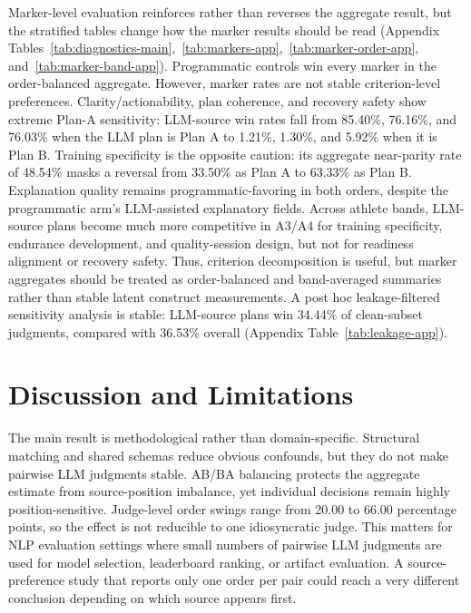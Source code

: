 \documentclass[11pt]{article}
\begin{document}
Marker-level evaluation reinforces rather than reverses the aggregate result, but the stratified tables change how the marker results should be read (Appendix Tables~\ref{tab:diagnostics-main},~\ref{tab:markers-app},~\ref{tab:marker-order-app}, and~\ref{tab:marker-band-app}). Programmatic controls win every marker in the order-balanced aggregate. However, marker rates are not stable criterion-level preferences. Clarity/actionability, plan coherence, and recovery safety show extreme Plan-A sensitivity: LLM-source win rates fall from 85.40\%, 76.16\%, and 76.03\% when the LLM plan is Plan A to 1.21\%, 1.30\%, and 5.92\% when it is Plan B. Training specificity is the opposite caution: its aggregate near-parity rate of 48.54\% masks a reversal from 33.50\% as Plan A to 63.33\% as Plan B. Explanation quality remains programmatic-favoring in both orders, despite the programmatic arm's LLM-assisted explanatory fields. Across athlete bands, LLM-source plans become much more competitive in A3/A4 for training specificity, endurance development, and quality-session design, but not for readiness alignment or recovery safety. Thus, criterion decomposition is useful, but marker aggregates should be treated as order-balanced and band-averaged summaries rather than stable latent construct measurements. A post hoc leakage-filtered sensitivity analysis is stable: LLM-source plans win 34.44\% of clean-subset judgments, compared with 36.53\% overall (Appendix Table~\ref{tab:leakage-app}).


\section{Discussion and Limitations}

The main result is methodological rather than domain-specific. Structural matching and shared schemas reduce obvious confounds, but they do not make pairwise LLM judgments stable. AB/BA balancing protects the aggregate estimate from source-position imbalance, yet individual decisions remain highly position-sensitive. Judge-level order swings range from 20.00 to 66.00 percentage points, so the effect is not reducible to one idiosyncratic judge. This matters for NLP evaluation settings where small numbers of pairwise LLM judgments are used for model selection, leaderboard ranking, or artifact evaluation. A source-preference study that reports only one order per pair could reach a very different conclusion depending on which source appears first.
\end{document}
